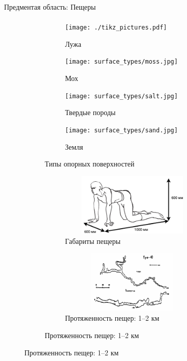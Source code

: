 \begin{frame}[t]{Предментая область: Пещеры}
    \framesubtitle{}
    \vspace{-0.8cm}
    \begin{figure}[H]
        \begin{subfigure}{0.49\textwidth}
            \begin{subfigure}[b]{0.49\textwidth}
                \centering\texttt{[image: ./tikz\_pictures.pdf]}
                \caption{Лужа}
            \end{subfigure}
            \hfill
            \begin{subfigure}[b]{0.49\textwidth}
                \centering\texttt{[image: surface\_types/moss.jpg]}\\
                \caption{Мох}
            \end{subfigure}

            \begin{subfigure}[b]{0.49\textwidth}
                \centering\texttt{[image: surface\_types/salt.jpg]}\\
                \caption{Твердые породы}
            \end{subfigure}
            \begin{subfigure}[b]{0.49\textwidth}
                \centering\texttt{[image: surface\_types/sand.jpg]}\\
                \caption{Земля}
            \end{subfigure}
            \caption*{Типы опорных поверхностей}
        \end{subfigure}
        \begin{subfigure}{0.49\textwidth}
            \begin{subfigure}{0.99\textwidth}
                \centering\includegraphics[height=3cm,width=1\textwidth,keepaspectratio]{../images/human_crawling.png}
                \caption*{Габариты пещеры}
            \end{subfigure}

            \begin{subfigure}{0.99\textwidth}
                \centering\includegraphics[height=3cm,width=1\textwidth,keepaspectratio]{../images/cave_maps/map3.png}
                \caption*{Протяженность пещер: 1--2 км}
            \end{subfigure}
        \end{subfigure}
    \end{figure}
\end{frame}

